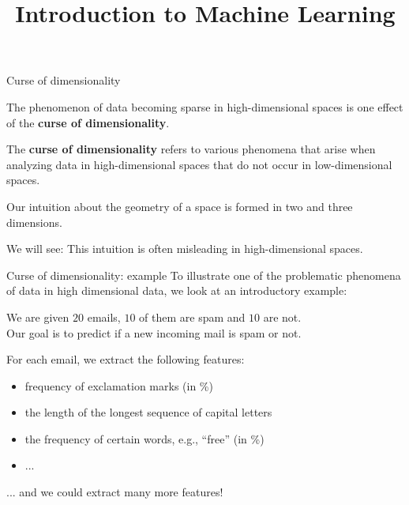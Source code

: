 \documentclass[11pt,compress,t,notes=noshow, xcolor=table]{beamer}
\title{Introduction to Machine Learning}
\begin{document}

\begin{framei}{Curse of dimensionality}
\item The phenomenon of data becoming sparse in high-dimensional spaces is one effect of the \textbf{curse of dimensionality}.
\item The \textbf{curse of dimensionality} refers to various phenomena that arise when analyzing data in high-dimensional spaces that do not occur in low-dimensional spaces.
\item Our intuition about the geometry of a space is formed in two and three dimensions.
\item We will see: This intuition is often misleading in high-dimensional spaces.
\end{framei}

\begin{framev}{Curse of dimensionality: example}
To illustrate one of the problematic phenomena of data in high dimensional data, we look at an introductory example:

\vfill

We are given $20$ emails, $10$ of them are spam and $10$ are not. \\
Our goal is to predict if a new incoming mail is spam or not.

\vfill

For each email, we extract the following features:

\begin{itemize}
\item frequency of exclamation marks (in \%)
\item the length of the longest sequence of capital letters
\item the frequency of certain words, e.g., \enquote{free} (in \%)
\item ...
\end{itemize}

... and we could extract many more features!
\vfill
\end{framev}
\end{document}
